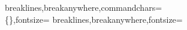 \usepackage{caption}


\captionsetup{font=eightpt}

\usepackage{fvextra}
%
  {breaklines,breakanywhere,commandchars=\\\{\},fontsize=\small}
%
  {breaklines,breakanywhere,fontsize=\small}